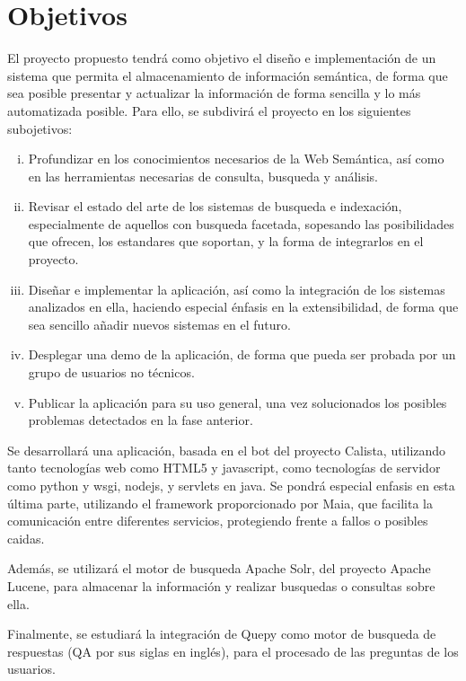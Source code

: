 \documentclass[a4paper,11pt]{report}
\begin{document}
\chapter*{Objetivos}

El proyecto propuesto tendrá como objetivo el diseño e implementación de un sistema que permita el almacenamiento de información semántica, de forma que sea posible presentar y actualizar la información de forma sencilla y lo más automatizada posible.
Para ello, se subdivirá el proyecto en los siguientes subojetivos:

\begin{enumerate}[i.]
  \item Profundizar en los conocimientos necesarios de la Web Semántica, así como en las herramientas necesarias de consulta, busqueda y análisis.
  \item Revisar el estado del arte de los sistemas de busqueda e indexación, especialmente de aquellos con busqueda facetada, sopesando las posibilidades que ofrecen, los estandares que soportan, y la forma de integrarlos en el proyecto.
  \item Diseñar e implementar la aplicación, así como la integración de los sistemas analizados en ella, haciendo especial énfasis en la extensibilidad, de forma que sea sencillo añadir nuevos sistemas en el futuro.
  \item Desplegar una demo de la aplicación, de forma que pueda ser probada por un grupo de usuarios no técnicos.
  \item Publicar la aplicación para su uso general, una vez solucionados los posibles problemas detectados en la fase anterior.

\end{enumerate}


Se desarrollará una aplicación, basada en el bot del proyecto Calista, utilizando tanto tecnologías web como HTML5 y javascript, como tecnologías de servidor como python y wsgi, nodejs, y servlets en java. Se pondrá especial enfasis en esta última parte, utilizando el framework proporcionado por Maia, que facilita la comunicación entre diferentes servicios, protegiendo frente a fallos o posibles caidas.

Además, se utilizará el motor de busqueda Apache Solr, del proyecto Apache Lucene, para almacenar la información y realizar busquedas o consultas sobre ella.

Finalmente, se estudiará la integración de Quepy como motor de busqueda de respuestas (QA por sus siglas en inglés), para el procesado de las preguntas de los usuarios.
\end{document}
